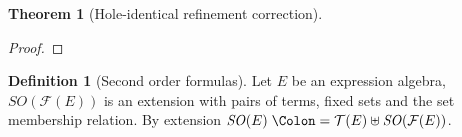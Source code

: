 \documentclass{article}
\theoremstyle{plain}
\newtheorem{thm}{Theorem}
\theoremstyle{definition}
\newtheorem{defi}{Definition}
\newcommand\mpar[1]{{\left(#1\right)}}
\newcommand\mdbrk[1]{\left⟦#1\right⟧}
\newcommand\defnotation{\DOTSB\;{\Colon=}\;}
\newcommand\defobject{\DOTSB\;{\coloneq}\;}
\newcommand\fterms[1]{{\mathcal{T}\mpar{#1}}}
\newcommand\fformulas[1]{{\mathcal{F}\mpar{#1}}}
\newcommand\OA[7]{\left<#1,#2,#3,#4, #5,#6,#7\right>}
\begin{document}
\begin{thm}[Hole-identical refinement correction] %
\end{thm}
\begin{proof}
\end{proof}
\begin{defi}[Second order formulas]
Let \(E\) be an expression algebra, \(\mathit{SO}\mpar{\fformulas{E}}\) is an extension with pairs of terms, fixed sets and the set membership relation.
By extension \(\mathit{SO}\mpar{E} \defnotation \fterms{E} \uplus \mathit{SO}\mpar{\fformulas{E}}\).
\end{defi}
\end{document}
